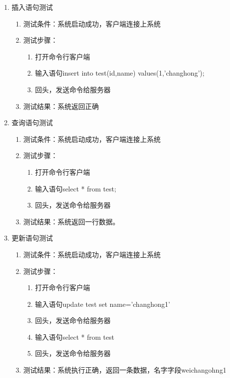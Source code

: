 \begin{enumerate}
\item 插入语句测试
\begin{enumerate}
	\item 测试条件：系统启动成功，客户端连接上系统
	\item 测试步骤：
	\begin{enumerate}
		\item 打开命令行客户端
		\item 输入语句insert into test(id,name) values(1,'changhong');
		\item 回头，发送命令给服务器
	\end{enumerate}
	\item 	测试结果：系统返回正确
\end{enumerate}	


\item 查询语句测试
\begin{enumerate}
	\item 测试条件：系统启动成功，客户端连接上系统
	\item 测试步骤：
	\begin{enumerate}
		\item 打开命令行客户端
		\item 输入语句select * from test;
		\item 回头，发送命令给服务器
	\end{enumerate}
	\item 	测试结果：系统返回一行数据。
\end{enumerate}	



\item 更新语句测试
\begin{enumerate}
	\item 测试条件：系统启动成功，客户端连接上系统
	\item 测试步骤：
	\begin{enumerate}
		\item 打开命令行客户端
		\item 输入语句update test set name='changhong1'
		\item 回头，发送命令给服务器
		\item 输入语句select * from test
		\item 回头，发送命令给服务器
	\end{enumerate}
	\item 	测试结果：系统执行正确，返回一条数据，名字字段weichangohng1
\end{enumerate}	



\end{enumerate}

